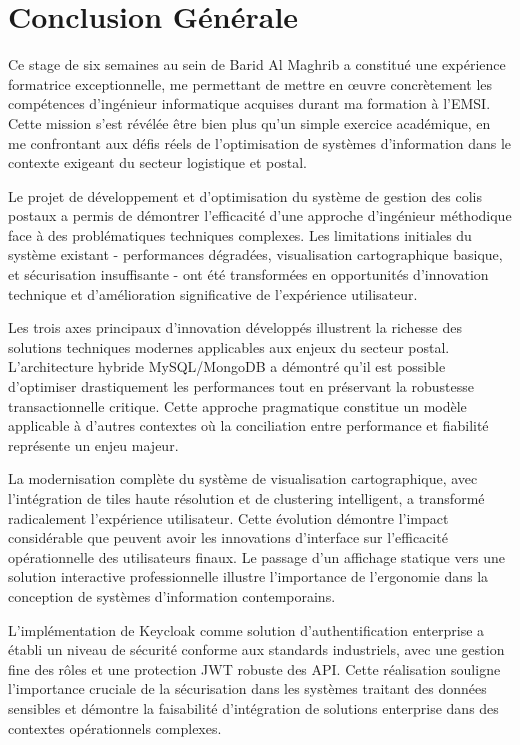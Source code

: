 \chapter*{Conclusion Générale}

Ce stage de six semaines au sein de Barid Al Maghrib a constitué une expérience formatrice exceptionnelle, me permettant de mettre en œuvre concrètement les compétences d'ingénieur informatique acquises durant ma formation à l'EMSI. Cette mission s'est révélée être bien plus qu'un simple exercice académique, en me confrontant aux défis réels de l'optimisation de systèmes d'information dans le contexte exigeant du secteur logistique et postal.

Le projet de développement et d'optimisation du système de gestion des colis postaux a permis de démontrer l'efficacité d'une approche d'ingénieur méthodique face à des problématiques techniques complexes. Les limitations initiales du système existant - performances dégradées, visualisation cartographique basique, et sécurisation insuffisante - ont été transformées en opportunités d'innovation technique et d'amélioration significative de l'expérience utilisateur.

Les trois axes principaux d'innovation développés illustrent la richesse des solutions techniques modernes applicables aux enjeux du secteur postal. L'architecture hybride MySQL/MongoDB a démontré qu'il est possible d'optimiser drastiquement les performances tout en préservant la robustesse transactionnelle critique. Cette approche pragmatique constitue un modèle applicable à d'autres contextes où la conciliation entre performance et fiabilité représente un enjeu majeur.

La modernisation complète du système de visualisation cartographique, avec l'intégration de tiles haute résolution et de clustering intelligent, a transformé radicalement l'expérience utilisateur. Cette évolution démontre l'impact considérable que peuvent avoir les innovations d'interface sur l'efficacité opérationnelle des utilisateurs finaux. Le passage d'un affichage statique vers une solution interactive professionnelle illustre l'importance de l'ergonomie dans la conception de systèmes d'information contemporains.

L'implémentation de Keycloak comme solution d'authentification enterprise a établi un niveau de sécurité conforme aux standards industriels, avec une gestion fine des rôles et une protection JWT robuste des API. Cette réalisation souligne l'importance cruciale de la sécurisation dans les systèmes traitant des données sensibles et démontre la faisabilité d'intégration de solutions enterprise dans des contextes opérationnels complexes.

